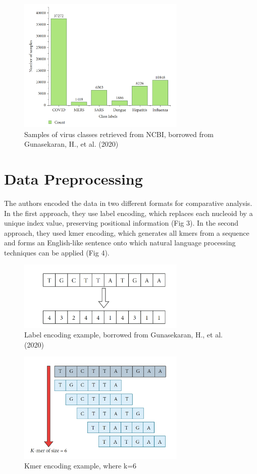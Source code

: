 \documentclass[journal]{IEEEtran}
\begin{document}
\begin{figure}
  \centering
  \includegraphics[width=8cm]{figures/data_collection.png}
  \caption{Samples of virus classes retrieved from NCBI, borrowed from Gunasekaran, H., et al. (2020)}
\end{figure}

\section{Data Preprocessing}
The authors encoded the data in two different formats for comparative analysis.
In the first approach, they use label encoding, which replaces each nucleoid by a unique index value,
preserving positional information (Fig 3).
In the second approach, they used kmer encoding, which generates all kmers from a sequence 
and forms an English-like sentence onto which natural language processing techniques
can be applied (Fig 4).

\begin{figure}
  \centering
  \includegraphics[width=8cm]{figures/label_encoding.png}
  \caption{Label encoding example, borrowed from Gunasekaran, H., et al. (2020)}
\end{figure}

\begin{figure}
  \centering
  \includegraphics[width=8cm]{figures/kmer_encoding.png}
  \caption{Kmer encoding example, where k=6}
\end{figure}
\end{document}
